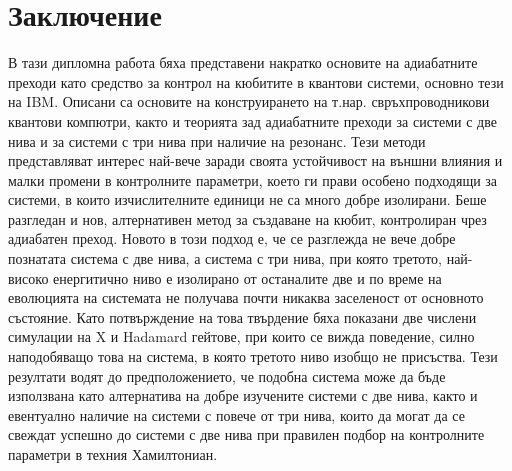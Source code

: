 \chapter{Заключение}

В тази дипломна работа бяха представени накратко основите на адиабатните преходи като средство за контрол
на кюбитите в квантови системи, основно тези на IBM. Описани са основите на конструирането на т.нар. свръхпроводникови
квантови компютри, както и теорията зад адиабатните преходи за системи с две нива и за системи с три нива при наличие на
резонанс. Тези методи представляват интерес най-вече заради своята устойчивост на външни влияния и малки промени в контролните
параметри, което ги прави особено подходящи за системи, в които изчислителните единици не са много добре изолирани. Беше разгледан и нов, алтернативен
метод за създаване на кюбит, контролиран чрез адиабатен преход. Новото в този подход е, че се разглежда не вече добре познатата система
с две нива, а система с три нива, при която третото, най-високо енергитично ниво е изолирано от останалите две и по време на
еволюцията на системата не получава почти никаква заселеност от основното състояние. Като потвърждение на това
твърдение бяха показани две числени симулации на X и Hadamard гейтове, при които се вижда поведение, силно наподобяващо
това на система, в която третото ниво изобщо не присъства. Тези резултати водят до предположението, че подобна система
може да бъде използвана като алтернатива на добре изучените системи с две нива, както и евентуално наличие на системи с
повече от три нива, които да могат да се свеждат успешно до системи с две нива при правилен подбор на контролните параметри
в техния Хамилтониан.